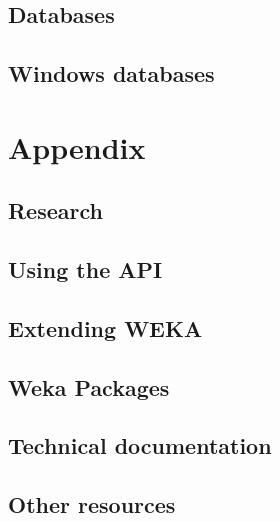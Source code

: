 \documentclass[a4paper]{book}
\begin{document}
\chapter{Databases}


\chapter{Windows databases}


\part{Appendix}
\chapter{Research}


\chapter{Using the API}


\chapter{Extending WEKA}


\chapter{Weka Packages}


\chapter{Technical documentation}


\chapter{Other resources}



\end{document}
